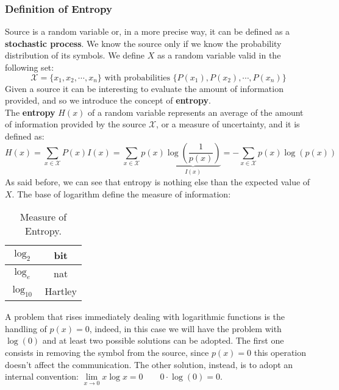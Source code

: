 
\subsubsection{Definition of Entropy}
Source is a random variable or, in a more precise way, it can be defined as a \textbf{stochastic process}. We know the source only if we know the probability distribution of its symbols.
We define $X$ as a random variable valid in the following set:
$$\mathcal{X} = \{x_1, x_2, \cdots, x_n\} \text{ with probabilities } \{P(x_1), P(x_2),\cdots, P(x_n)\} $$
Given a source it can be interesting to evaluate the amount of information provided, and so we introduce the concept of \textbf{entropy}.\\
The \textbf{entropy} $H(x)$ of a random variable represents an average of the amount of information provided by the source $\mathcal{X}$, or a measure of uncertainty, and it is defined as:
$$H(x) = \sum_{x \in \mathcal{X}} P(x)I(x) = \sum_{x \in \mathcal{X}} p(x) \underbrace{\log\left( \frac{1}{p(x)}\right)}_{I(x)} = - \sum_{x \in \mathcal{X}} p(x) \log(p(x))$$
As said before, we can see that entropy is nothing else than the expected value of $X$.
The base of logarithm define the measure of information:
\begin{table}[H]
	\centering
	\begin{tabular}{| c | c |}
		\hline
		$\log_2$ & bit\\
		\hline
		$\log_e$ & nat\\
		\hline
		$\log_{10}$ & Hartley\\
		\hline
	\end{tabular}
	\caption{Measure of Entropy.}
\end{table}

A problem that rises immediately dealing with logarithmic functions is the handling of $p(x) = 0$, indeed, in this case we will have the problem with $\log(0)$ and at least two possible solutions can be adopted. The first one consists in removing the symbol from the source, since $p(x) = 0$ this operation doesn't affect the communication. The other solution, instead, is to adopt an internal convention: $\lim\limits_{x\rightarrow 0}x \log x = 0 	\qquad 0 \cdot \log(0) = 0$.

